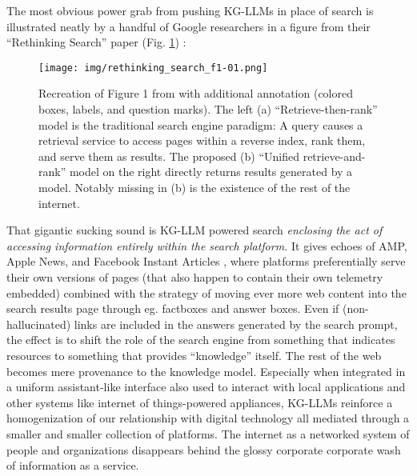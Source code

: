 The most obvious power grab from pushing KG-LLMs in place of search is
illustrated neatly by a handful of Google researchers in a figure from
their ``Rethinking Search'' paper (Fig. \ref{fig:rethinkingsearch}) \cite{metzlerRethinkingSearchMaking2021} :

\begin{figure}
\texttt{[image: img/rethinking\_search\_f1-01.png]}
\caption{Recreation of Figure 1 from \cite{metzlerRethinkingSearchMaking2021}  with additional annotation
(colored boxes, labels, and question marks). The left (a)
``Retrieve-then-rank'' model is the traditional search engine paradigm:
A query causes a retrieval service to access pages within a reverse
index, rank them, and serve them as results. The proposed (b) ``Unified
retrieve-and-rank'' model on the right directly returns results
generated by a model. Notably missing in (b) is the existence of the
rest of the internet.}
\label{fig:rethinkingsearch}
\end{figure}

That gigantic sucking sound is KG-LLM powered search \emph{enclosing the
act of accessing information entirely within the search platform.} It
gives echoes of AMP, Apple News, and Facebook Instant Articles \cite{ampletterLetterGoogleAMP2018, bohnGooglePlanMake2018} , where
platforms preferentially serve their own versions of pages (that also
happen to contain their own telemetry embedded) combined with the
strategy of moving ever more web content into the search results page
through eg. factboxes and answer boxes. Even if (non-hallucinated) links are included
in the answers generated by the search prompt, the effect is to shift
the role of the search engine from something that indicates resources to
something that provides ``knowledge'' itself. The rest of the web
becomes mere provenance to the knowledge model. Especially when
integrated in a uniform assistant-like interface also used to interact
with local applications and other systems like internet of
things-powered appliances, KG-LLMs reinforce a homogenization of our
relationship with digital technology all mediated through a smaller and
smaller collection of platforms. The internet as a networked system of
people and organizations disappears behind the glossy corporate
corporate wash of information as a service.

